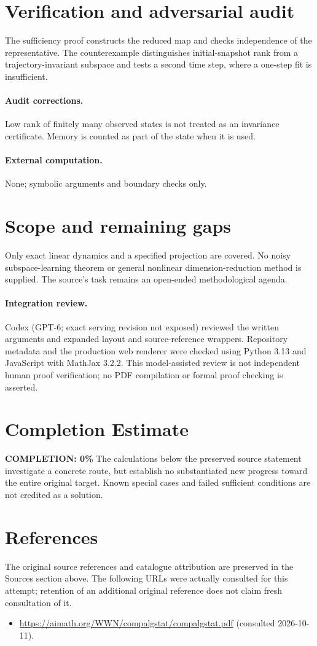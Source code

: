 \documentclass[11pt]{article}
\begin{document}
\section{Verification and adversarial audit}
The sufficiency proof constructs the reduced map and checks independence of the representative. The counterexample distinguishes initial-snapshot rank from a trajectory-invariant subspace and tests a second time step, where a one-step fit is insufficient.
\paragraph{Audit corrections.} Low rank of finitely many observed states is not treated as an invariance certificate. Memory is counted as part of the state when it is used.
\paragraph{External computation.} None; symbolic arguments and boundary checks only.
\section{Scope and remaining gaps}
Only exact linear dynamics and a specified projection are covered. No noisy subspace-learning theorem or general nonlinear dimension-reduction method is supplied. The source's task remains an open-ended methodological agenda.
\paragraph{Integration review.} Codex (GPT-6; exact serving revision not exposed) reviewed the written arguments and expanded layout and source-reference wrappers. Repository metadata and the production web renderer were checked using Python 3.13 and JavaScript with MathJax 3.2.2. This model-assisted review is not independent human proof verification; no PDF compilation or formal proof checking is asserted.

\section{Completion Estimate}
\noindent\textbf{COMPLETION: 0\%}
The calculations below the preserved source statement investigate a concrete route,
but establish no substantiated new progress toward the entire original target.
Known special cases and failed sufficient conditions are not credited as a solution.
\section{References}
The original source references and catalogue attribution are preserved in the
Sources section above. The following URLs were actually consulted for this attempt;
retention of an additional original reference does not claim fresh consultation of it.
\begin{itemize}
\item \url{https://aimath.org/WWN/compalgstat/compalgstat.pdf} (consulted 2026-10-11). 
\end{itemize}
\end{document}
